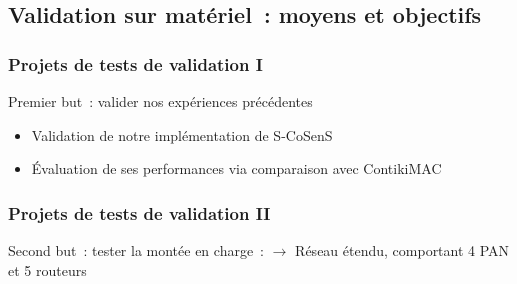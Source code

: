 \documentclass[10pt,c]{beamer}
\begin{document}
\subsection{Validation sur matériel~: moyens et objectifs}

\begin{frame}[label=Validation1]
\frametitle{Projets de tests de validation I}

\begin{block}{Premier but~: valider nos expériences précédentes}
\begin{itemize}
\item Validation de notre implémentation de S-CoSenS
\item \'Evaluation de ses performances via comparaison avec ContikiMAC
\end{itemize}
\end{block}

\end{frame}

\begin{frame}[label=Validation2]
\frametitle{Projets de tests de validation II}

\vspace{-0.25cm}

\begin{block}{Second but~: tester la montée en charge~:}
$\rightarrow$ Réseau étendu, comportant 4 PAN et 5 routeurs
\end{block}

\vspace{-0.25cm}

\end{frame}
\end{document}
